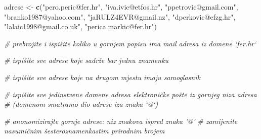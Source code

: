 \documentclass[]{book}
\newenvironment{Shaded}{\begin{snugshade}}{\end{snugshade}}
\newcommand{\KeywordTok}[1]{\textcolor[rgb]{0.13,0.29,0.53}{\textbf{#1}}}
\newcommand{\DecValTok}[1]{\textcolor[rgb]{0.00,0.00,0.81}{#1}}
\newcommand{\StringTok}[1]{\textcolor[rgb]{0.31,0.60,0.02}{#1}}
\newcommand{\CommentTok}[1]{\textcolor[rgb]{0.56,0.35,0.01}{\textit{#1}}}
\newcommand{\OperatorTok}[1]{\textcolor[rgb]{0.81,0.36,0.00}{\textbf{#1}}}
\newcommand{\NormalTok}[1]{#1}
\theoremstyle{definition}
\theoremstyle{definition}
\theoremstyle{definition}
\theoremstyle{remark}
\begin{document}
\begin{Shaded}
\begin{Highlighting}[]
\NormalTok{adrese <-}\StringTok{ }\KeywordTok{c}\NormalTok{(}\StringTok{"pero.peric@fer.hr"}\NormalTok{, }\StringTok{"iva.ivic@etfos.hr"}\NormalTok{, }\StringTok{"ppetrovic@gmail.com"}\NormalTok{, }
            \StringTok{"branko1987@yahoo.com"}\NormalTok{, }\StringTok{"jaRULZ4EVR@gmail.nz"}\NormalTok{, }\StringTok{"dperkovic@efzg.hr"}\NormalTok{, }
            \StringTok{"lalaic1998@gmail.co.uk"}\NormalTok{, }\StringTok{"perica.markic@fer.hr"}\NormalTok{)}

\CommentTok{# prebrojite i ispišite koliko u gornjem popisu ima mail adresa iz domene `fer.hr`}

\CommentTok{# ispišite sve adrese koje sadrže bar jednu znamenku}

\CommentTok{# ispišite sve adrese koje na drugom mjestu imaju samoglasnik}

\CommentTok{# ispišite sve jedinstvene domene adresa elektroničke pošte iz gornjeg niza adresa}
\CommentTok{# (domenom smatramo dio adrese iza znaka `@`)}

\CommentTok{# anonomizirajte gornje adrese: niz znakova ispred znaka '@'}
\CommentTok{# zamijenite nasumičnim šesteroznamenkastim prirodnim brojem }
\end{Highlighting}
\end{Shaded}

\begin{Shaded}
\end{Shaded}
\end{document}
